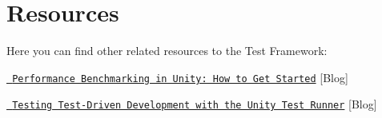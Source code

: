 \chapter{Resources}
\hypertarget{md__library_2_package_cache_2com_8unity_8test-framework_0d1_81_833_2_documentation_0i_2resources}{}\label{md__library_2_package_cache_2com_8unity_8test-framework_0d1_81_833_2_documentation_0i_2resources}
\label{md__library_2_package_cache_2com_8unity_8test-framework_0d1_81_833_2_documentation_0i_2resources_autotoc_md722}%
%
 Here you can find other related resources to the  Test Framework\+:


\begin{DoxyItemize}
\item \href{https://blogs.unity3d.com/2018/09/25/performance-benchmarking-in-unity-how-to-get-started/}{\texttt{ Performance Benchmarking in Unity\+: How to Get Started}} \mbox{[}Blog\mbox{]}
\item \href{https://blogs.unity3d.com/2018/11/02/testing-test-driven-development-with-the-unity-test-runner/}{\texttt{ Testing Test-\/\+Driven Development with the Unity Test Runner}} \mbox{[}Blog\mbox{]} 
\end{DoxyItemize}